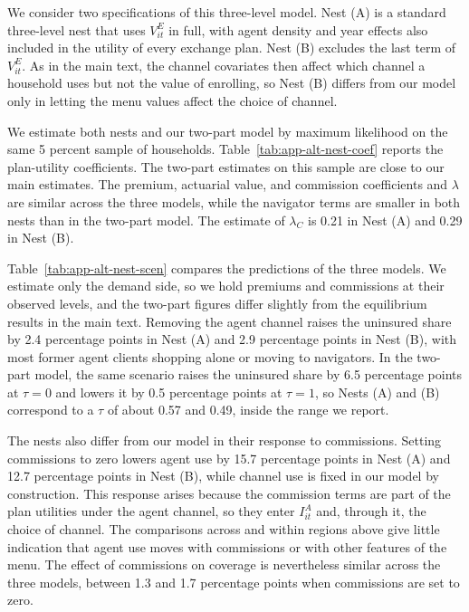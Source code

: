 \documentclass[12pt]{article}
\begin{document}
We consider two specifications of this three-level model. Nest (A) is a standard three-level nest that uses $V^E_{it}$ in full, with agent density and year effects also included in the utility of every exchange plan. Nest (B) excludes the last term of $V^E_{it}$. As in the main text, the channel covariates then affect which channel a household uses but not the value of enrolling, so Nest (B) differs from our model only in letting the menu values affect the choice of channel.

We estimate both nests and our two-part model by maximum likelihood on the same 5 percent sample of households. Table~\ref{tab:app-alt-nest-coef} reports the plan-utility coefficients. The two-part estimates on this sample are close to our main estimates. The premium, actuarial value, and commission coefficients and $\lambda$ are similar across the three models, while the navigator terms are smaller in both nests than in the two-part model. The estimate of $\lambda_C$ is 0.21 in Nest (A) and 0.29 in Nest (B).

Table~\ref{tab:app-alt-nest-scen} compares the predictions of the three models. We estimate only the demand side, so we hold premiums and commissions at their observed levels, and the two-part figures differ slightly from the equilibrium results in the main text. Removing the agent channel raises the uninsured share by 2.4 percentage points in Nest (A) and 2.9 percentage points in Nest (B), with most former agent clients shopping alone or moving to navigators. In the two-part model, the same scenario raises the uninsured share by 6.5 percentage points at $\tau = 0$ and lowers it by 0.5 percentage points at $\tau = 1$, so Nests (A) and (B) correspond to a $\tau$ of about 0.57 and 0.49, inside the range we report.

The nests also differ from our model in their response to commissions. Setting commissions to zero lowers agent use by 15.7 percentage points in Nest (A) and 12.7 percentage points in Nest (B), while channel use is fixed in our model by construction. This response arises because the commission terms are part of the plan utilities under the agent channel, so they enter $I^A_{it}$ and, through it, the choice of channel. The comparisons across and within regions above give little indication that agent use moves with commissions or with other features of the menu. The effect of commissions on coverage is nevertheless similar across the three models, between 1.3 and 1.7 percentage points when commissions are set to zero.
\end{document}

